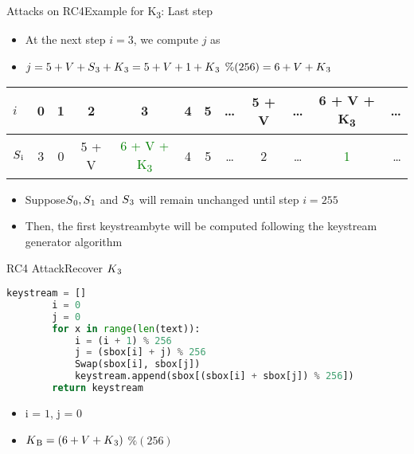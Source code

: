 \documentclass[
	aspectratio=169,	%
	onlytextwidth,		%
	t					%
	]{beamer}
\begin{document}
\begin{frame}[fragile]{Attacks on RC4}{Example for K\textsubscript{3}: Last step}

	
	\begin{itemize}
		\item At the next step $i = 3$, we compute $j$ as
		\item $j = 5 + V + S\textsubscript{3} + K\textsubscript{3} = 5 + V + 1 + K\textsubscript{3}$ $\%(256) = 6 + V + K\textsubscript{3}$
	\end{itemize}
	
	\begin{table}[h!]
		\begin{center}
			\begin{tabular}{l|c|c|c|c|c|c|c|c|c|c|r}
			$i$ & 0 & 1 & 2 & 3 & 4 & 5 & \dots & 5 + V & \dots & 6 + V + K\textsubscript{3} & \dots\\
			\hline
			$S\textsubscript{i}$ & 3 & 0 & 5 + V & \textcolor{green}{6 + V + K\textsubscript{3}} & 4 & 5 & \dots & 2 & \dots & \textcolor{green}{1} & \dots\\
			\end{tabular}
		\end{center}
	\end{table}

	\begin{itemize}
		\item Suppose$ S\textsubscript{0}, S\textsubscript{1}$ and $S\textsubscript{3}$ will remain unchanged until step $i = 255$
		\item Then, the first keystreambyte will be computed following the keystream generator algorithm
	\end{itemize}

\end{frame}

\begin{frame}[fragile]{RC4 Attack}{Recover $K\textsubscript{3}$}

	\begin{lstlisting}[language=Python]
		keystream = []
		i = 0
		j = 0
		for x in range(len(text)):
			i = (i + 1) % 256
			j = (sbox[i] + j) % 256
			Swap(sbox[i], sbox[j])
			keystream.append(sbox[(sbox[i] + sbox[j]) % 256])    
		return keystream   
	\end{lstlisting}
	\begin{itemize}
		\item i = $1$, j = $0$
		\item $K\textsubscript{B} = (6 + V + K\textsubscript{3})$ $\% (256)$
	\end{itemize}

\end{frame}
\end{document}
